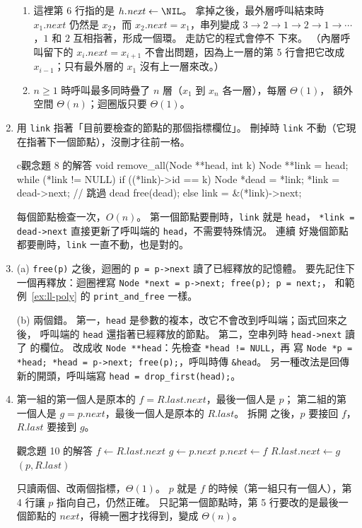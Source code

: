 \begin{enumerate}
\begin{enumerate}
\item 這裡第 6 行指的是 $h.\mathit{next} \gets \NIL$。 拿掉之後，最外層呼叫結束時
$x_1.\mathit{next}$ 仍然是 $x_2$，而 $x_2.\mathit{next} = x_1$，串列變成 $3 \to 2
\to 1 \to 2 \to 1 \to \cdots$，$1$ 和 $2$ 互相指著，形成一個環。 走訪它的程式會停不
下來。 （內層呼叫留下的 $x_i.\mathit{next} = x_{i+1}$ 不會出問題，因為上一層的第 5
行會把它改成 $x_{i-1}$；只有最外層的 $x_1$ 沒有上一層來改。）

\item $n \ge 1$ 時呼叫最多同時疊了 $n$ 層（$x_1$ 到 $x_n$ 各一層），每層 $\Theta(1)$，
額外空間 $\Theta(n)$；迴圈版只要 $\Theta(1)$。
\end{enumerate}

\item 用 \texttt{link} 指著「目前要檢查的節點的那個指標欄位」。 刪掉時
\texttt{link} 不動（它現在指著下一個節點），沒刪才往前一格。
\begin{code}{c}{觀念題 8 的解答}
void remove_all(Node **head, int k)
{
    Node **link = head;
    while (*link != NULL) {
        if ((*link)->id == k) {
            Node *dead = *link;
            *link = dead->next;     // 跳過 dead
            free(dead);
        } else {
            link = &(*link)->next;
        }
    }
}
\end{code}
每個節點檢查一次，$O(n)$。 第一個節點要刪時，\texttt{link} 就是 \texttt{head}，
\texttt{*link = dead->next} 直接更新了呼叫端的 \texttt{head}，不需要特殊情況。 連續
好幾個節點都要刪時，\texttt{link} 一直不動，也是對的。

\item (a) \texttt{free(p)} 之後，迴圈的 \texttt{p = p->next} 讀了已經釋放的記憶體。
要先記住下一個再釋放：迴圈裡寫 \texttt{Node *next = p->next; free(p); p = next;}，
和範例~\ref{ex:ll-poly} 的 \texttt{print\_and\_free} 一樣。

(b) 兩個錯。 第一，\texttt{head} 是參數的複本，改它不會改到呼叫端；函式回來之後，
呼叫端的 \texttt{head} 還指著已經釋放的節點。 第二，空串列時 \texttt{head->next}
讀了 \NIL 的欄位。 改成收 \texttt{Node **head}：先檢查 \texttt{*head != NULL}，再
寫 \texttt{Node *p = *head; *head = p->next; free(p);}，呼叫時傳
\texttt{\&head}。 另一種改法是回傳新的開頭，呼叫端寫
\texttt{head = drop\_first(head);}。

\item 第一組的第一個人是原本的 $f = R.\mathit{last}.\mathit{next}$，最後一個人是 $p$；
第二組的第一個人是 $g = p.\mathit{next}$，最後一個人是原本的 $R.\mathit{last}$。 拆開
之後，$p$ 要接回 $f$，$R.\mathit{last}$ 要接到 $g$。
\begin{pseudo}{觀念題 10 的解答}
    \State $f \gets R.\mathit{last}.\mathit{next}$ 
    \State $g \gets p.\mathit{next}$ 
    \State $p.\mathit{next} \gets f$
    \State $R.\mathit{last}.\mathit{next} \gets g$
    \State \Return $(p, R.\mathit{last})$
\EndFunction
\end{pseudo}
只讀兩個、改兩個指標，$\Theta(1)$。 $p$ 就是 $f$ 的時候（第一組只有一個人），第 4 行讓
$p$ 指向自己，仍然正確。 只記第一個節點時，第 5 行要改的是最後一個節點的
$\mathit{next}$，得繞一圈才找得到，變成 $\Theta(n)$。


\end{enumerate}
